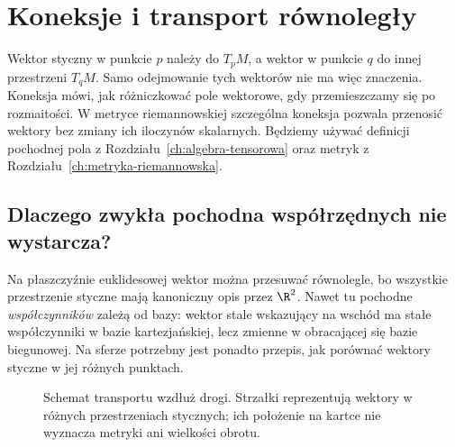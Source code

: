 \chapter{Koneksje i transport równoległy}
\label{ch:koneksje}

\providecommand{\atlasref}[2]{#2}

Wektor styczny w punkcie $p$ należy do $T_pM$, a wektor
w punkcie $q$ do innej przestrzeni $T_qM$. Samo odejmowanie
tych wektorów nie ma więc znaczenia. Koneksja mówi,
jak różniczkować pole wektorowe, gdy przemieszczamy się
po rozmaitości. W metryce riemannowskiej szczególna
koneksja pozwala przenosić wektory bez zmiany ich
iloczynów skalarnych. Będziemy używać definicji
pochodnej pola z Rozdziału~\ref{ch:algebra-tensorowa}
oraz metryk z Rozdziału~\ref{ch:metryka-riemannowska}.

\section{Dlaczego zwykła pochodna współrzędnych nie wystarcza?}
\label{sec:koneksja-motywacja}

Na płaszczyźnie euklidesowej wektor można przesuwać
równolegle, bo wszystkie przestrzenie styczne mają
kanoniczny opis przez $\R^2$. Nawet tu pochodne
\emph{współczynników} zależą od bazy: wektor stale
wskazujący na wschód ma stałe współczynniki w bazie
kartezjańskiej, lecz zmienne w obracającej się bazie
biegunowej. Na sferze potrzebny jest ponadto przepis,
jak porównać wektory styczne w jej różnych punktach.

\begin{figure}[htbp]
\centering
{}
\caption{Schemat transportu wzdłuż drogi. Strzałki reprezentują wektory w różnych przestrzeniach stycznych; ich położenie na kartce nie wyznacza metryki ani wielkości obrotu.}
\label{fig:koneksja-transport-idea}
\end{figure}


